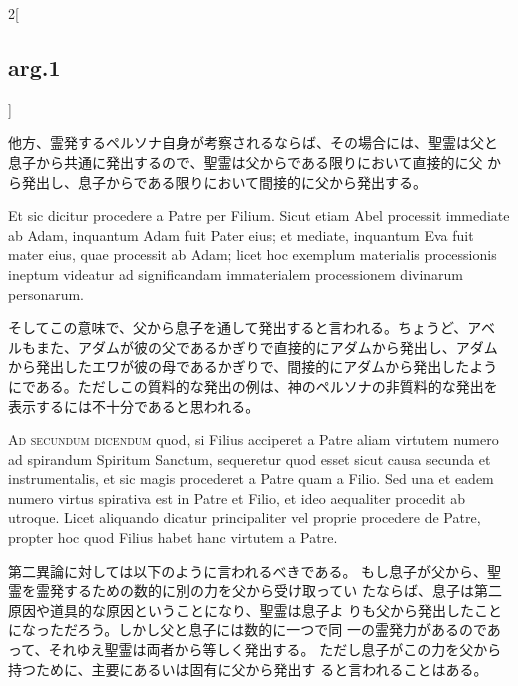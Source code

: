 \documentclass[paper=a4paper,fontsize=10pt,jafontsize=9pt,titlepage]{jlreq}
\begin{document}
\begin{paracol}{2}[\subsection{arg.1}]
\switchcolumn

他方、霊発するペルソナ自身が考察されるならば、その場合には、聖霊は父と
 息子から共通に発出するので、聖霊は父からである限りにおいて直接的に父
 から発出し、息子からである限りにおいて間接的に父から発出する。

\switchcolumn*

Et sic dicitur
procedere a Patre per Filium. Sicut etiam Abel processit immediate ab
Adam, inquantum Adam fuit Pater eius; et mediate, inquantum Eva fuit
mater eius, quae processit ab Adam; licet hoc exemplum materialis
processionis ineptum videatur ad significandam immaterialem
processionem divinarum personarum.

\switchcolumn

そしてこの意味で、父から息子を通して発出すると言われる。ちょうど、アベ
ルもまた、アダムが彼の父であるかぎりで直接的にアダムから発出し、アダム
から発出したエワが彼の母であるかぎりで、間接的にアダムから発出したよう
にである。ただしこの質料的な発出の例は、神のペルソナの非質料的な発出を
表示するには不十分であると思われる。

\switchcolumn*[\subsection{ad.2}]

{\scshape Ad secundum dicendum} quod, si Filius acciperet a Patre aliam virtutem
numero ad spirandum  Spiritum Sanctum, sequeretur quod esset sicut
causa secunda et instrumentalis, et sic magis procederet a Patre quam
a Filio. Sed una et eadem numero virtus spirativa est in Patre et
Filio, et ideo aequaliter procedit ab utroque. Licet aliquando dicatur
principaliter vel proprie procedere de Patre, propter hoc quod Filius
habet hanc virtutem a Patre.

\switchcolumn

第二異論に対しては以下のように言われるべきである。
もし息子が父から、聖霊を霊発するための数的に別の力を父から受け取ってい
たならば、息子は第二原因や道具的な原因ということになり、聖霊は息子よ
りも父から発出したことになっただろう。しかし父と息子には数的に一つで同
 一の霊発力があるのであって、それゆえ聖霊は両者から等しく発出する。
ただし息子がこの力を父から持つために、主要にあるいは固有に父から発出す
 ると言われることはある。

\switchcolumn*[\subsection{ad.3}]


\end{paracol}
\end{document}
